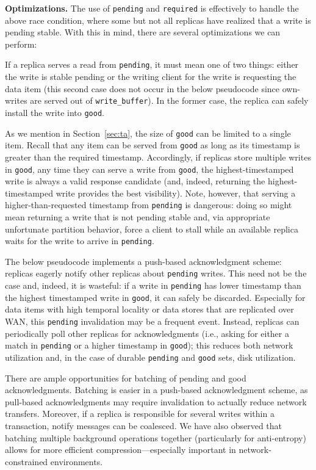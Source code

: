 \vspace{1em}\noindent\textbf{Optimizations.} The use of \texttt{pending} and \texttt{required} is effectively to
handle the above race condition, where some but not all replicas have
realized that a write is pending stable. With this in mind, there are
several optimizations we can perform:

If a replica serves a read from \texttt{pending}, it must mean one of
two things: either the write is stable pending or the writing client
for the write is requesting the data item (this second case does not
occur in the below pseudocode since own-writes are served out
of \texttt{write\_buffer}). In the former case, the replica can safely
install the write into \texttt{good}.

As we mention in Section~\ref{sec:ta}, the size of \texttt{good} can
be limited to a single item. Recall that any item can be served
from \texttt{good} as long as its timestamp is greater than the
required timestamp. Accordingly, if replicas store multiple writes
in \texttt{good}, any time they can serve a write from \texttt{good},
the highest-timestamped write is always a valid response candidate
(and, indeed, returning the highest-timestamped write provides the
best visibility). Note, however, that serving a higher-than-requested
timestamp from \texttt{pending} is dangerous: doing so might mean
returning a write that is not pending stable and, via appropriate
unfortunate partition behavior, force a client to stall while an
available replica waits for the write to arrive in \texttt{pending}.

The below pseudocode implements a push-based acknowledgment scheme: replicas
eagerly notify other replicas about \texttt{pending} writes. This need
not be the case and, indeed, it is wasteful: if a write
in \texttt{pending} has lower timestamp than the highest timestamped
write in \texttt{good}, it can safely be discarded. Especially for
data items with high temporal locality or data stores that are
replicated over WAN, this \texttt{pending} invalidation may be a
frequent event. Instead, replicas can periodically poll other replicas
for acknowledgments (i.e., asking for either a match
in \texttt{pending} or a higher timestamp in \texttt{good}); this
reduces both network utilization and, in the case of
durable \texttt{pending} and \texttt{good} sets, disk utilization.

There are ample opportunities for batching of pending and good
acknowledgments. Batching is easier in a push-based acknowledgment
scheme, as pull-based acknowledgments may require invalidation to
actually reduce network transfers. Moreover, if a replica is
responsible for several writes within a transaction, \textrm{notify}
messages can be coalesced. We have also observed that batching
multiple background operations together (particularly for
anti-entropy) allows for more efficient compression---especially
important in network-constrained environments.

